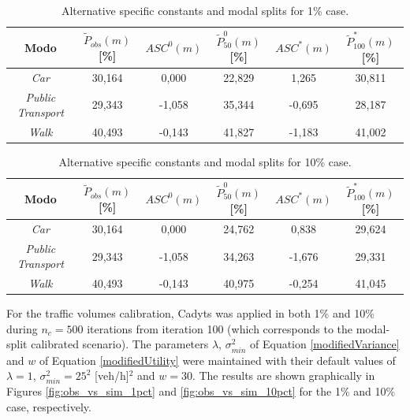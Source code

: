 \documentclass[Journal,letterpaper]{ascelike-new}
\begin{document}
\begin{table}
\caption{Alternative specific constants and modal splits for 1\% case.}
\begin{tabular}{c|c|cc|cc}
\hline
Modo                      &$\tilde{P}_{obs}(m)$ [\%]& $ASC^{0}(m)$	& $\tilde{P}_{50}^{0}(m)$ [\%]	& $ASC^{*}(m)$& $\tilde{P}_{100}^{*}(m)$ [\%]\\
\hline
\emph{Car}             	  & 30,164 & 0,000 & 22,829 & 1,265  & 30,811 \\
\emph{Public Transport}   & 29,343 &-1,058 & 35,344 & -0,695 & 28,187 \\
\emph{Walk}               & 40,493 &-0,143 & 41,827 & -1,183 & 41,002 \\
\hline
\end{tabular}
\label{table:modal_splits_1pct}
\end{table}

\begin{table}
	\caption{Alternative specific constants and modal splits for 10\% case.}
	\begin{tabular}{c|c|cc|cc}
		\hline
		Modo                      &$\tilde{P}_{obs}(m)$ [\%]& $ASC^{0}(m)$	& $\tilde{P}_{50}^{0}(m)$ [\%]	& $ASC^{*}(m)$& $\tilde{P}_{100}^{*}(m)$ [\%]\\
		\hline
		\emph{Car}             	  & 30,164 & 0,000 & 24,762 & 0,838  & 29,624 \\
		\emph{Public Transport}   & 29,343 &-1,058 & 34,263 & -1,676 & 29,331 \\
		\emph{Walk}               & 40,493 &-0,143 & 40,975 & -0,254 & 41,045 \\
		\hline
	\end{tabular}
\label{table:modal_splits_10pct}
\end{table}

For the traffic volumes calibration, Cadyts was applied in both 1\% and 10\% during $n_{c}=500$ iterations from iteration 100 (which corresponds to the modal-split calibrated scenario). The parameters $\lambda$, $\sigma^{2}_{min}$ of Equation \ref{modifiedVariance} and $w$ of Equation \ref{modifiedUtility} were maintained with their default values of $\lambda=1$, $\sigma^{2}_{min}=25^2$ [veh/h]$^2$ and $w=30$. The results are shown graphically in Figures \ref{fig:obs_vs_sim_1pct} and \ref{fig:obs_vs_sim_10pct} for the 1\% and 10\% case, respectively.
\end{document}
